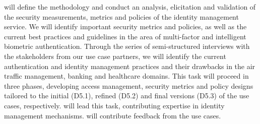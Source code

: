 \begin{Workpackage}{\thewpno}
\begin{WPDescription}
\end{WPDescription}

\begin{Task}
\TaskResults{%
\ref{del:auth1},
\ref{del:auth2},
\ref{del:auth3}
}
\TaskHeader{}

\theTask{} will define the methodology and conduct an analysis, elicitation and validation of the security measurements, metrics and policies of the identity management service. 
We will identify important security metrics and policies, as well as the current best practices and guidelines in the area of multi-factor and intelligent biometric authentication. Through the series of semi-structured interviews with the stakeholders from our use case partners, we will identify the current authentication and identity management practices and their drawbacks in the air traffic management, banking and healthcare domains. This task will proceed in three phases, developing access management, security metrics and policy designs tailored to the initial (D5.1), refined (D5.2) and final versions (D5.3) of the use cases, respectively.  \COGNIshort{} will lead this task, contributing expertise in identity management mechanisms. \SOPRAshort{} will contribute feedback from the use cases.
  

\end{Task}
\end{Workpackage}
